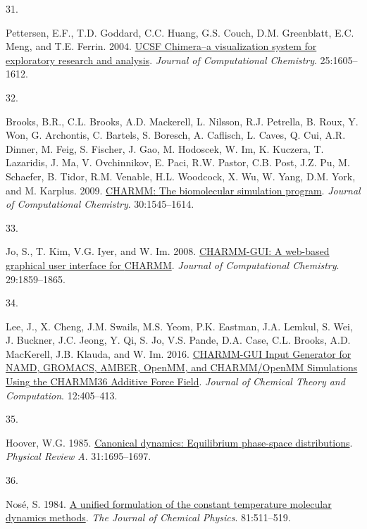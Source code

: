 \documentclass[
  twocolumn]{biophys-new-mod}
\newlength{\cslhangindent}
\newlength{\csllabelwidth}
\newlength{\cslentryspacingunit} %
\newenvironment{CSLReferences}[2] %
 {%
  \setlength{\parindent}{0pt}
  \ifodd #1
  \let\oldpar\par
  \def\par{\hangindent=\cslhangindent\oldpar}
  \fi
  \setlength{\parskip}{#2\cslentryspacingunit}
 }%
 {}
\newcommand{\CSLLeftMargin}[1]{\parbox[t]{\csllabelwidth}{#1}}
\newcommand{\CSLRightInline}[1]{\parbox[t]{\linewidth - \csllabelwidth}{#1}\break}
\begin{document}
\begin{CSLReferences}{0}{0}
\leavevmode{}%
\CSLLeftMargin{31. }%
\CSLRightInline{Pettersen, E.F., T.D. Goddard, C.C. Huang, G.S. Couch,
D.M. Greenblatt, E.C. Meng, and T.E. Ferrin. 2004.
\href{https://doi.org/10.1002/jcc.20084}{{UCSF Chimera--a} visualization
system for exploratory research and analysis}. \emph{Journal of
Computational Chemistry}. 25:1605--1612.}

\leavevmode{}%
\CSLLeftMargin{32. }%
\CSLRightInline{Brooks, B.R., C.L. Brooks, A.D. Mackerell, L. Nilsson,
R.J. Petrella, B. Roux, Y. Won, G. Archontis, C. Bartels, S. Boresch, A.
Caflisch, L. Caves, Q. Cui, A.R. Dinner, M. Feig, S. Fischer, J. Gao, M.
Hodoscek, W. Im, K. Kuczera, T. Lazaridis, J. Ma, V. Ovchinnikov, E.
Paci, R.W. Pastor, C.B. Post, J.Z. Pu, M. Schaefer, B. Tidor, R.M.
Venable, H.L. Woodcock, X. Wu, W. Yang, D.M. York, and M. Karplus. 2009.
\href{https://doi.org/10.1002/jcc.21287}{{CHARMM}: {The} biomolecular
simulation program}. \emph{Journal of Computational Chemistry}.
30:1545--1614.}

\leavevmode{}%
\CSLLeftMargin{33. }%
\CSLRightInline{Jo, S., T. Kim, V.G. Iyer, and W. Im. 2008.
\href{https://doi.org/10.1002/jcc.20945}{{CHARMM-GUI}: A web-based
graphical user interface for {CHARMM}}. \emph{Journal of Computational
Chemistry}. 29:1859--1865.}

\leavevmode{}%
\CSLLeftMargin{34. }%
\CSLRightInline{Lee, J., X. Cheng, J.M. Swails, M.S. Yeom, P.K. Eastman,
J.A. Lemkul, S. Wei, J. Buckner, J.C. Jeong, Y. Qi, S. Jo, V.S. Pande,
D.A. Case, C.L. Brooks, A.D. MacKerell, J.B. Klauda, and W. Im. 2016.
\href{https://doi.org/10.1021/acs.jctc.5b00935}{{CHARMM-GUI Input
Generator} for {NAMD}, {GROMACS}, {AMBER}, {OpenMM}, and
{CHARMM}/{OpenMM Simulations Using} the {CHARMM36 Additive Force
Field}}. \emph{Journal of Chemical Theory and Computation}.
12:405--413.}

\leavevmode{}%
\CSLLeftMargin{35. }%
\CSLRightInline{Hoover, W.G. 1985.
\href{https://doi.org/10.1103/PhysRevA.31.1695}{Canonical dynamics:
{Equilibrium} phase-space distributions}. \emph{Physical Review A}.
31:1695--1697.}

\leavevmode{}%
\CSLLeftMargin{36. }%
\CSLRightInline{Nosé, S. 1984. \href{https://doi.org/10.1063/1.447334}{A
unified formulation of the constant temperature molecular dynamics
methods}. \emph{The Journal of Chemical Physics}. 81:511--519.}


\end{CSLReferences}
\end{document}
